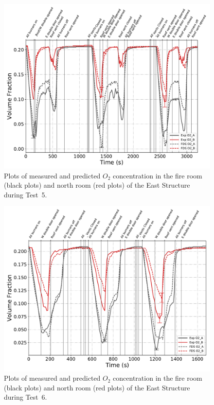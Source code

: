 \begin{figure}[!h]
	\centering
	\includegraphics[width=\columnwidth]{Figures/Plots/Validation/Gas_Concentration/Test_5_O2}
	\caption[Plots of measured and predicted $O_2$ concentration during Test~5.]{Plots of measured and predicted $O_2$ concentration in the fire room (black plots) and north room (red plots) of the East Structure during Test~5.}
	\label{fig:Test5_O2}
\end{figure}

\begin{figure}[!h]
	\centering
	\includegraphics[width=\columnwidth]{Figures/Plots/Validation/Gas_Concentration/Test_6_O2}
	\caption[Plots of measured and predicted $O_2$ concentration during Test~6.]{Plots of measured and predicted $O_2$ concentration in the fire room (black plots) and north room (red plots) of the East Structure during Test~6.}
	\label{fig:Test6_O2}
\end{figure}

